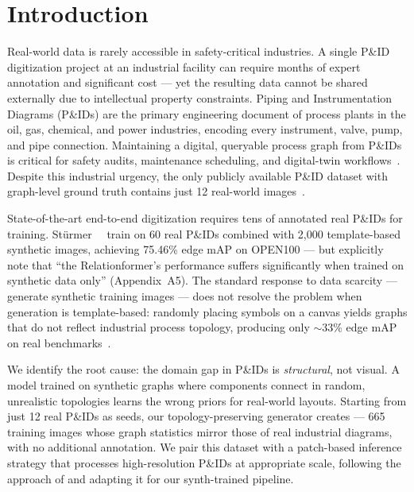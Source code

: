 
\section{Introduction}
\label{sec:intro}

Real-world data is rarely accessible in safety-critical industries.
A single P\&ID digitization project at an industrial facility can require
months of expert annotation and significant cost — yet the resulting data
cannot be shared externally due to intellectual property constraints.
Piping and Instrumentation Diagrams (P\&IDs) are the primary engineering
document of process plants in the oil, gas, chemical, and power industries,
encoding every instrument, valve, pump, and pipe connection.
Maintaining a digital, queryable process graph from P\&IDs is critical for
safety audits, maintenance scheduling, and digital-twin
workflows~\cite{toghraei2019}.
Despite this industrial urgency, the only publicly available P\&ID dataset
with graph-level ground truth contains just 12 real-world images~\cite{sturmer2025}.

State-of-the-art end-to-end digitization requires tens of annotated real
P\&IDs for training.
Stürmer~\etal~\cite{sturmer2025} train on 60 real P\&IDs combined with
2,000 template-based synthetic images, achieving 75.46\% edge mAP on
OPEN100 --- but explicitly note that ``the Relationformer's performance
suffers significantly when trained on synthetic data only''
(Appendix~A5).
The standard response to data scarcity --- generate synthetic training
images --- does not resolve the problem when generation is template-based:
randomly placing symbols on a canvas yields graphs that do not reflect
industrial process topology, producing only ${\sim}33\%$ edge mAP on real
benchmarks~\cite{sturmer2025}.

We identify the root cause: the domain gap in P\&IDs is
\emph{structural}, not visual.
A model trained on synthetic graphs where components connect in random,
unrealistic topologies learns the wrong priors for real-world layouts.
Starting from just 12 real P\&IDs as seeds, our topology-preserving
generator creates \ours{} --- 665 training images whose graph statistics
mirror those of real industrial diagrams, with no additional annotation.
We pair this dataset with a patch-based inference strategy that processes
high-resolution P\&IDs at appropriate scale, following the approach of
\cite{sturmer2025} and adapting it for our synth-trained pipeline.

